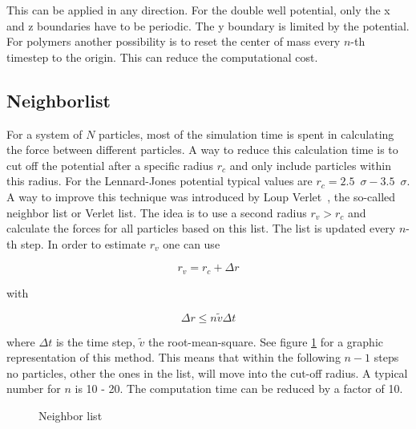 \documentclass[a4paper]{article}
\begin{document}
\vspace{12pt}

This can be applied in any direction. For the double well potential, only the x and z boundaries have to be periodic. The y boundary is limited by the potential. For polymers another possibility is to reset the center of mass every $n$-th timestep to the origin. This can reduce the computational cost.

\subsection{Neighborlist}

For a system of $N$ particles, most of the simulation time is spent in calculating the force between different particles. A way to reduce this calculation time is to cut off the potential after a specific radius $r_c$ and only include particles within this radius. For the Lennard-Jones potential typical values are $r_c = 2.5 \enspace \sigma - 3.5\enspace \sigma$. A way to improve this technique was introduced by Loup Verlet~\cite{Verlet1967}, the so-called neighbor list or Verlet list. The idea is to use a second radius $r_v > r_c$  and calculate the forces for all particles based on this list. The list is updated every $n$-th step. In order to estimate $r_v$ one can use

\begin{equation}
r_v = r_c + \Delta r
\label{eq:neigbor1}
\end{equation}

with

\begin{equation}
\Delta r \leq n \tilde{v} \Delta t
\label{eq:neighbor2}
\end{equation}

where $\Delta t$ is the time step, $\tilde{v}$ the root-mean-square. See figure \ref{im:neighbor_list} for a graphic representation of this method. This means that within the following $n-1$ steps no particles, other the ones in the list, will move into the cut-off radius. A typical number for $n$ is 10 - 20. The computation time can be reduced by a factor of 10.

\begin{figure}[H]
\centering
{}
\label{im:neighbor_list}
\caption{Neighbor list}
\end{figure}
\end{document}
